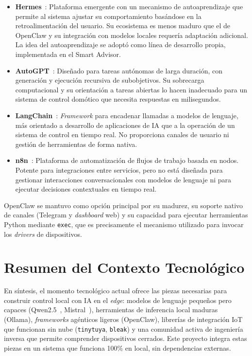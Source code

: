 \begin{itemize}
    \item \textbf{Hermes}~\cite{hermes_agent}: Plataforma emergente con un mecanismo de autoaprendizaje que permite al sistema ajustar su comportamiento basándose en la retroalimentación del usuario. Su ecosistema es menos maduro que el de OpenClaw y su integración con modelos locales requería adaptación adicional. La idea del autoaprendizaje se adoptó como línea de desarrollo propia, implementada en el Smart Advisor.
    \item \textbf{AutoGPT}~\cite{autogpt}: Diseñado para tareas autónomas de larga duración, con generación y ejecución recursiva de subobjetivos. Su sobrecarga computacional y su orientación a tareas abiertas lo hacen inadecuado para un sistema de control domótico que necesita respuestas en milisegundos.
    \item \textbf{LangChain}~\cite{langchain}: \textit{Framework} para encadenar llamadas a modelos de lenguaje, más orientado a desarrollo de aplicaciones de IA que a la operación de un sistema de control en tiempo real. No proporciona canales de usuario ni gestión de herramientas de forma nativa.
    \item \textbf{n8n}~\cite{n8n}: Plataforma de automatización de flujos de trabajo basada en nodos. Potente para integraciones entre servicios, pero no está diseñada para gestionar interacciones conversacionales con modelos de lenguaje ni para ejecutar decisiones contextuales en tiempo real.
\end{itemize}

OpenClaw se mantuvo como opción principal por su madurez, su soporte nativo de canales (Telegram y \textit{dashboard} web) y su capacidad para ejecutar herramientas Python mediante \texttt{exec}, que es precisamente el mecanismo utilizado para invocar los \textit{drivers} de dispositivos.

\section{Resumen del Contexto Tecnológico}

En síntesis, el momento tecnológico actual ofrece las piezas necesarias para construir control local con IA en el \textit{edge}: modelos de lenguaje pequeños pero capaces (Qwen2.5~\cite{hui_qwen25_coder_2024}, Mistral~\cite{mistral_7b}), herramientas de inferencia local maduras (Ollama), \textit{frameworks} agénticos ligeros (OpenClaw), librerías de integración IoT que funcionan sin nube (\texttt{tinytuya}, \texttt{bleak}) y una comunidad activa de ingeniería inversa que permite comprender dispositivos cerrados. Este proyecto integra estas piezas en un sistema que funciona 100\% en local, sin dependencias externas.
